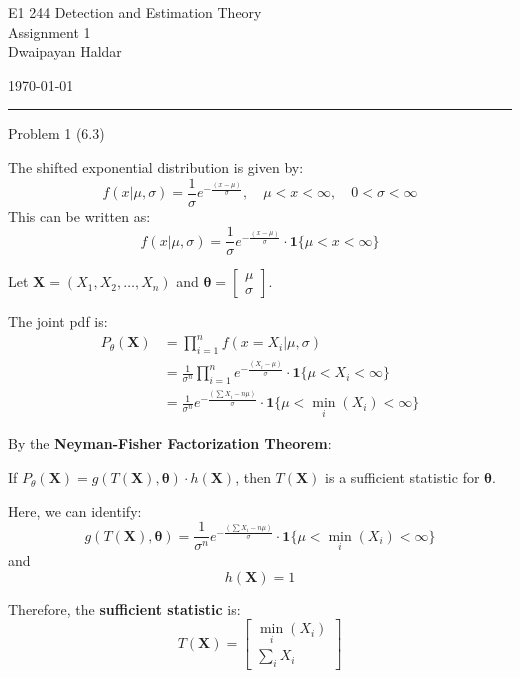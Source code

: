\documentclass[12pt,a4paper,onecolumn]{exam}
\newcommand{\questionheader}[1]{%
  \begin{tcolorbox}[
    enhanced,
    colback=black,
    coltext=white,
    boxrule=0pt,
    fontupper=\Large\bfseries,
    arc=4mm
  ]
  #1
  \end{tcolorbox}%
}
\begin{document}
\begingroup
    \centering
    \LARGE E1 244 Detection and Estimation Theory\\
    \LARGE Assignment 1\\[0.5em]
    \large Dwaipayan Haldar\par
    \large \today\\[0.5em] 
\endgroup
\noindent\rule{\textwidth}{0.5pt}
\printanswers
\renewcommand{\solutiontitle}{\noindent\textbf{Ans:}\enspace}

\questionheader{Problem 1 (6.3)}

\begin{solution}
The shifted exponential distribution is given by:
\[
f(x|\mu, \sigma) = \frac{1}{\sigma} e^{-\frac{(x-\mu)}{\sigma}}, \quad \mu < x < \infty, \quad 0 < \sigma < \infty
\]
This can be written as:
\[
f(x|\mu, \sigma) = \frac{1}{\sigma} e^{-\frac{(x-\mu)}{\sigma}} \cdot \mathbf{1}\{\mu < x < \infty\}
\]

Let $\mathbf{X} = (X_1, X_2, \ldots, X_n)$ and $\boldsymbol{\theta} = \begin{bmatrix} \mu \\ \sigma \end{bmatrix}$.

The joint pdf is:
\begin{align*}
P_{\theta}(\mathbf{X}) &= \prod_{i=1}^{n} f(x = X_i | \mu, \sigma) \\
&= \frac{1}{\sigma^n} \prod_{i=1}^{n} e^{-\frac{(X_i - \mu)}{\sigma}} \cdot \mathbf{1}\{\mu < X_i < \infty\} \\
&= \frac{1}{\sigma^n} e^{-\frac{(\sum X_i - n\mu)}{\sigma}} \cdot \mathbf{1}\{\mu < \min_i(X_i) < \infty\}
\end{align*}

By the \textbf{Neyman-Fisher Factorization Theorem}:

If $P_{\theta}(\mathbf{X}) = g(T(\mathbf{X}), \boldsymbol{\theta}) \cdot h(\mathbf{X})$, then $T(\mathbf{X})$ is a sufficient statistic for $\boldsymbol{\theta}$.

Here, we can identify:
\[
g(T(\mathbf{X}), \boldsymbol{\theta}) = \frac{1}{\sigma^n} e^{-\frac{(\sum X_i - n\mu)}{\sigma}} \cdot \mathbf{1}\{\mu < \min_i(X_i) < \infty\}
\]
and
\[
h(\mathbf{X}) = 1
\]

Therefore, the \textbf{sufficient statistic} is:
\[
\boxed{T(\mathbf{X}) = \begin{bmatrix} \min_i(X_i) \\ \sum_i X_i \end{bmatrix}}
\]
\end{solution}
\end{document}
